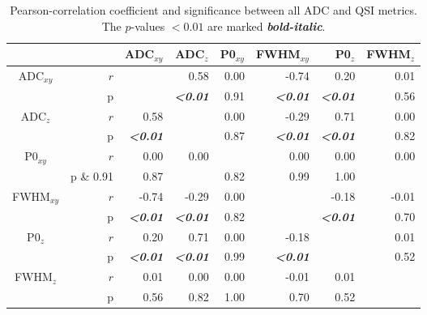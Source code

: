 \begin{table}
	\centering
    \caption{Pearson-correlation coefficient and significance between all ADC and QSI metrics. The $p$-values $<0.01$ are marked \textbf\emph{bold-italic}.}
	 \begin{adjustbox}{width=0.8\textwidth,keepaspectratio}
	 \begin{minipage}{\textwidth}
	 \begin{tabular}{rrrrrrrr}
	    \addlinespace
	    \toprule
	          &       & ADC$_{xy}$  & ADC$_{z}$  & P0$_{xy}$   & FWHM$_{xy}$   & P0$_{z}$   & FWHM$_{z}$ \\
	    \midrule
	    \multicolumn{1}{c}{\multirow{2}[0]{*}{ADC$_{xy}$}} & $\mathit{r}$   &       & 0.58  & 0.00  & -0.74 & 0.20  & 0.01 \\
	    \multicolumn{1}{c}{} & {p} & {} & {\textbf{\emph{<0.01}}} & {0.91} & {\textbf{\emph{<0.01}}} & {\textbf{\emph{<0.01}}} & {0.56} \\[2.0ex]
	    \multicolumn{1}{c}{\multirow{2}[0]{*}{ADC$_{z}$}} & $\mathit{r}$   & 0.58  &       & 0.00  & -0.29 & 0.71  & 0.00 \\
	    \multicolumn{1}{c}{} & {p} & {\textbf{\emph{<0.01}}} & {} & {0.87} & {\textbf{\emph{<0.01}}} & {\textbf{\emph{<0.01}}} & {0.82} \\[2.0ex]
	    \multicolumn{1}{c}{\multirow{2}[0]{*}{P0$_{xy}$}} & $\mathit{r}$   & 0.00  & 0.00  &       & 0.00  & 0.00  & 0.00 \\
	    \multicolumn{1}{c}{} & {p} \& {0.91} & {0.87} & {} & {0.82} & {0.99} & {1.00} \\[2.0ex]
	    \multicolumn{1}{c}{\multirow{2}[0]{*}{FWHM$_{xy}$}} & $\mathit{r}$   & -0.74 & -0.29 & 0.00  &       & -0.18 & -0.01 \\
	    \multicolumn{1}{c}{} & {p} & {\textbf{\emph{<0.01}}} & {\textbf{\emph{<0.01}}} & {0.82} & {} & {\textbf{\emph{<0.01}}} & {0.70} \\[2.0ex]
	    \multicolumn{1}{c}{\multirow{2}[0]{*}{P0$_{z}$}} & $\mathit{r}$   & 0.20  & 0.71  & 0.00  & -0.18 &       & 0.01 \\
	    \multicolumn{1}{c}{} & {p} & {\textbf{\emph{<0.01}}} & {\textbf{\emph{<0.01}}} & {0.99} & \textbf{\emph{<0.01}} & {} & {0.52} \\[2.0ex]
	    \multicolumn{1}{c}{\multirow{2}[0]{*}{FWHM$_{z}$}} & $\mathit{r}$   & 0.01  & 0.00  & 0.00  & -0.01 & 0.01  &  \\
	    \multicolumn{1}{c}{} & {p} & {0.56} & {0.82} & {1.00} & {0.70} & {0.52} & {} \\
    \bottomrule
    \end{tabular}%
	\end{minipage}
	\end{adjustbox}
  \label{tab:chapter5 exp1 correlations}
\end{table}%

